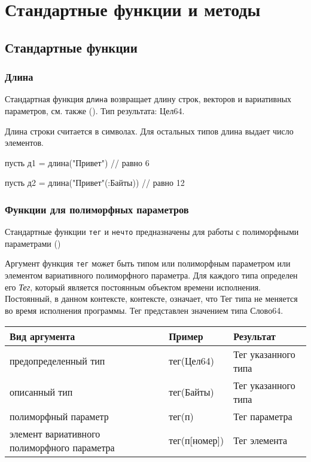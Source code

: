 \hypertarget{stdfuncs}{%
\section{Стандартные функции и методы}\label{stdfuncs:chapter}}

\hypertarget{std-funcs}{%
\subsection{Стандартные функции}\label{stdfuncs:std-funcs}}

\hypertarget{stdlen}{%
\subsubsection{Длина}\label{stdfuncs:stdlen}}

Стандартная функция \verb+длина+ возвращает длину строк, векторов и вариативных параметров, см. также (). Тип результата: Цел64.

Длина строки считается в символах. Для остальных типов длина выдает число элементов.

\begin{Trivil}
    пусть д1 = длина("Привет") // равно 6

    пусть д2 = длина("Привет"(:Байты)) // равно 12
\end{Trivil}

\hypertarget{stdpoly}{%
\subsubsection{Функции для полиморфных параметров}\label{stdfuncs:stdpoly}}

Стандартные функции \verb+тег+ и \verb+нечто+ предназначены для работы с полиморфными параметрами ()

Аргумент функция \verb+тег+ может быть типом или полиморфным параметром или элементом вариативного полиморфного параметра. 
Для каждого типа определен его \emph{Тег}, который является постоянным объектом времени исполнения. 
Постоянный, в данном контексте, контексте, означает, что Тег типа не меняется во время исполнения программы.
Тег представлен значением типа Слово64.

\bigskip
\begin{tabular}[c]{p{4.5cm}|l|l}
 \textbf{Вид аргумента} & \textbf{Пример}  & \textbf{Результат}  \\ 
\hline
предопределенный тип & тег(Цел64) &  Тег указанного типа \\
описанный тип & тег(Байты) &  Тег указанного типа \\
полиморфный параметр & тег(п) & Тег параметра \\
элемент вариативного полиморфного параметра & тег(п[номер]) & Тег элемента \\
\hline
\end{tabular}

